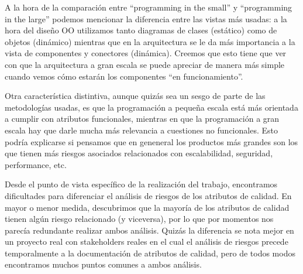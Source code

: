 \documentclass[a4paper, 10pt, twoside]{article}
\begin{document}
A la hora de la comparación entre ``programming in the small'' y ``programming in the large'' podemos mencionar la diferencia entre las vistas más usadas: a la hora del 
diseño OO utilizamos tanto diagramas de clases (estático) como de objetos (dinámico) mientras que en la arquitectura se le da más importancia a la vista de
componentes y conectores (dinámica). Creemos que esto tiene que ver con que la arquitectura a gran escala se puede apreciar de manera más simple cuando vemos
cómo estarán los componentes ``en funcionamiento''.

Otra característica distintiva, aunque quizás sea un sesgo de parte de las metodologías usadas, es que la programación a pequeña escala está más orientada
a cumplir con atributos funcionales, mientras en que la programación a gran escala hay que darle mucha más relevancia a cuestiones no funcionales. Esto podría explicarse
si pensamos que en geneneral los productos más grandes son los que tienen más riesgos asociados relacionados con escalabilidad, seguridad, performance, etc.

Desde el punto de vista específico de la realización del trabajo, encontramos dificultades para diferenciar el análisis de riesgos de los atributos de calidad.
En mayor o menor medida, descubrimos que la mayoría de los atributos de calidad tienen algún riesgo relacionado (y viceversa), por lo que por momentos nos 
parecía redundante realizar ambos análisis. Quizás la diferencia se nota mejor en un proyecto real con stakeholders reales en el cual el análisis de riesgos
precede temporalmente a la documentación de atributos de calidad, pero de todos modos encontramos muchos puntos comunes a ambos análisis.
\end{document}
